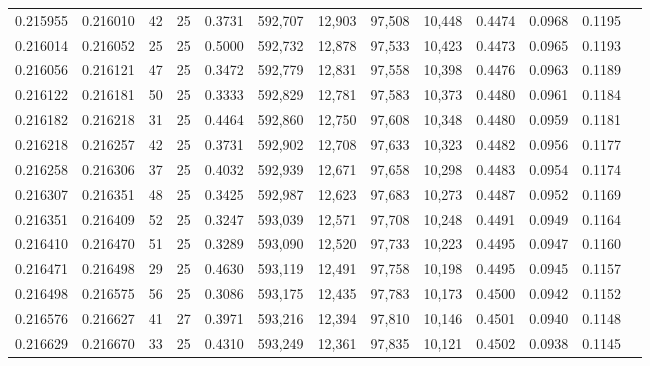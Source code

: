\begin{tabular}{rrrrrrrrrrrrr}
0.215955 & 0.216010 &  42 &  25 &                                     0.3731 & 592,707 &  12,903 &  97,508 &  10,448 & 0.4474 & 0.0968 & 0.1195 \\
0.216014 & 0.216052 &  25 &  25 &                                     0.5000 & 592,732 &  12,878 &  97,533 &  10,423 & 0.4473 & 0.0965 & 0.1193 \\
0.216056 & 0.216121 &  47 &  25 &                                     0.3472 & 592,779 &  12,831 &  97,558 &  10,398 & 0.4476 & 0.0963 & 0.1189 \\
0.216122 & 0.216181 &  50 &  25 &                                     0.3333 & 592,829 &  12,781 &  97,583 &  10,373 & 0.4480 & 0.0961 & 0.1184 \\
0.216182 & 0.216218 &  31 &  25 &                                     0.4464 & 592,860 &  12,750 &  97,608 &  10,348 & 0.4480 & 0.0959 & 0.1181 \\
0.216218 & 0.216257 &  42 &  25 &                                     0.3731 & 592,902 &  12,708 &  97,633 &  10,323 & 0.4482 & 0.0956 & 0.1177 \\
0.216258 & 0.216306 &  37 &  25 &                                     0.4032 & 592,939 &  12,671 &  97,658 &  10,298 & 0.4483 & 0.0954 & 0.1174 \\
0.216307 & 0.216351 &  48 &  25 &                                     0.3425 & 592,987 &  12,623 &  97,683 &  10,273 & 0.4487 & 0.0952 & 0.1169 \\
0.216351 & 0.216409 &  52 &  25 &                                     0.3247 & 593,039 &  12,571 &  97,708 &  10,248 & 0.4491 & 0.0949 & 0.1164 \\
0.216410 & 0.216470 &  51 &  25 &                                     0.3289 & 593,090 &  12,520 &  97,733 &  10,223 & 0.4495 & 0.0947 & 0.1160 \\
0.216471 & 0.216498 &  29 &  25 &                                     0.4630 & 593,119 &  12,491 &  97,758 &  10,198 & 0.4495 & 0.0945 & 0.1157 \\
0.216498 & 0.216575 &  56 &  25 &                                     0.3086 & 593,175 &  12,435 &  97,783 &  10,173 & 0.4500 & 0.0942 & 0.1152 \\
0.216576 & 0.216627 &  41 &  27 &                                     0.3971 & 593,216 &  12,394 &  97,810 &  10,146 & 0.4501 & 0.0940 & 0.1148 \\
0.216629 & 0.216670 &  33 &  25 &                                     0.4310 & 593,249 &  12,361 &  97,835 &  10,121 & 0.4502 & 0.0938 & 0.1145 \\

\end{tabular}
